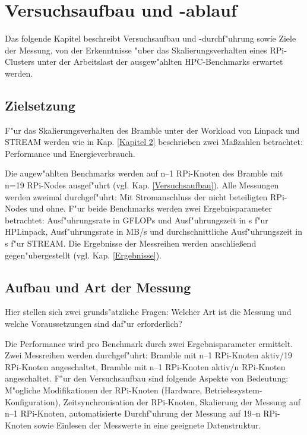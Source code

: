 \chapter{Versuchsaufbau und -ablauf}\label{Kap3}

Das folgende Kapitel beschreibt Versuchsaufbau und -durchf"uhrung sowie Ziele der Messung, von der Erkenntnisse "uber das Skalierungsverhalten eines RPi-Clusters unter der Arbeitslast der ausgew"ahlten HPC-Benchmarks erwartet werden. 

\section{Zielsetzung}\label{Ziel}

F"ur das Skalierungsverhalten des Bramble unter der Workload von Linpack und STREAM werden wie in Kap. \ref{Kapitel 2} beschrieben zwei Ma\ss zahlen betrachtet: Performance und Energieverbrauch.

Die augew"ahlten Benchmarks werden auf n--1 RPi-Knoten des Bramble mit n=19 RPi-Nodes ausgef"uhrt (vgl. Kap. \ref{Versuchsaufbau}). Alle Messungen werden zweimal durchgef"uhrt: Mit Stromanschluss der nicht beteiligten RPi-Nodes und ohne. F"ur beide Benchmarks werden zwei Ergebnisparameter betrachtet: Ausf"uhrungsrate in GFLOPs und Ausf"uhrungszeit in s f"ur HPLinpack, Ausf"uhrungsrate in MB/s und durchschnittliche Ausf"uhrungszeit in s f"ur STREAM. Die Ergebnisse der Messreihen werden anschlie\ss end gegen"ubergestellt (vgl. Kap. \ref{Ergebnisse}). 

\section{Aufbau und Art der Messung}\label{Aufbau}

Hier stellen sich zwei grunds"atzliche Fragen: Welcher Art ist die Messung und welche Voraussetzungen sind daf"ur erforderlich? 

Die Performance wird pro Benchmark durch zwei Ergebnisparameter ermittelt. Zwei Messreihen werden durchgef"uhrt: Bramble mit n--1 RPi-Knoten aktiv/19 RPi-Knoten angeschaltet, Bramble mit n--1 RPi-Knoten aktiv/n RPi-Knoten angeschaltet. 
F"ur den Versuchsaufbau sind folgende Aspekte von Bedeutung: M"ogliche Modifikationen der RPi-Knoten (Hardware, Betriebssystem-Konfiguration), Zeitsynchronisation der RPi-Knoten, Skalierung der Messung auf n--1 RPi-Knoten, automatisierte Durchf"uhrung der Messung auf 19--n RPi-Knoten sowie Einlesen der Messwerte in eine geeignete Datenstruktur. 

